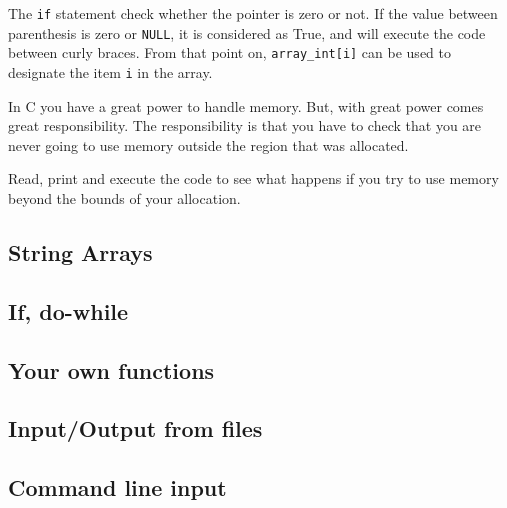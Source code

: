 \documentclass{article}
\begin{document}
The \verb"if" statement check whether the pointer is zero or not. If the value between parenthesis is zero or \verb"NULL", it is considered as True, and will execute the code between curly braces. From that point on, \verb"array_int[i]" can be used to designate the item \verb"i" in the array.

In C you have a great power to handle memory. But, with great power comes great responsibility. The responsibility is that you have to check that you are never going to use memory outside the region that was allocated.

Read, print and execute the code to see what happens if you try to use memory beyond the bounds of your allocation.

\subsection{String Arrays}



\subsection{If, do-while}



\subsection{Your own functions}


\subsection{Input/Output from files}


\subsection{Command line input}

\end{document}
